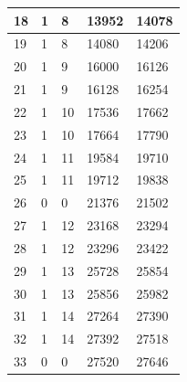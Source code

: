 \documentclass{article}
\begin{document}
\begin{table}[H]
\begin{center}
\begin{tabular}{| p{1cm} | p{1.75cm} | p{1.75cm} | p{1.75cm} | p{1.75cm} |}
                    18 & 1 & 8 & 13952 & 14078 \\
                    \hline
                    19 & 1 & 8 & 14080 & 14206 \\
                    \hline
                    20 & 1 & 9 & 16000 & 16126 \\
                    \hline
                    21 & 1 & 9 & 16128 & 16254 \\
                    \hline
                    22 & 1 & 10 & 17536 & 17662 \\
                    \hline
                    23 & 1 & 10 & 17664 & 17790 \\
                    \hline
                    24 & 1 & 11 & 19584 & 19710 \\
                    \hline
                    25 & 1 & 11 & 19712 & 19838 \\
                    \hline
                    26 & 0 & 0 & 21376 & 21502 \\
                    \hline
                    27 & 1 & 12 & 23168 & 23294 \\
                    \hline
                    28 & 1 & 12 & 23296 & 23422 \\
                    \hline
                    29 & 1 & 13 & 25728 & 25854 \\
                    \hline
                    30 & 1 & 13 & 25856 & 25982 \\
                    \hline
                    31 & 1 & 14 & 27264 & 27390 \\
                    \hline
                    32 & 1 & 14 & 27392 & 27518 \\
                    \hline
                    33 & 0 & 0 & 27520 & 27646 \\
                    \hline
                \end{tabular}
            \end{center}
        \end{table}
\end{document}
